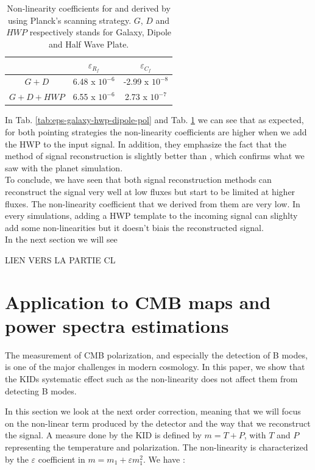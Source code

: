 \begin{table}[h!]
\center
	\begin{tabular}{|c|c|c|}
  	\hline
 	\backslashbox{$Input signal$}{$\varepsilon$} & $	\varepsilon_{R_{f}}$ & $\varepsilon_{C_{f}} $ \\
	\hline
 	$G+D$  & 6.48 x $10^{-6}$ & -2.99 x $10^{-8}$ \\
  	\hline
 	$G+D+HWP$ & 6.55 x $10^{-6}$ & 2.73 x $10^{-7}$ \\
  	\hline
	\end{tabular} 
\caption{Non-linearity coefficients \eps for \rf and \cf derived by using Planck's scanning strategy. $G$, $D$ and $HWP$ respectively stands for Galaxy, Dipole and Half Wave Plate.}
\label{tab:eps-galaxy-hwp-dipole-planck}
\end{table}

In Tab. \ref{tab:eps-galaxy-hwp-dipole-pol} and Tab. \ref{tab:eps-galaxy-hwp-dipole-planck} we can see that as expected, for both pointing strategies the non-linearity coefficients are higher when we add the HWP to the input signal. In addition, they emphasize the fact that the \cf method of signal reconstruction is slightly better than \rf, which confirms what we saw with the planet simulation.\\

To conclude, we have seen that both signal reconstruction methods can reconstruct the signal very well at low fluxes but start to be limited at higher fluxes. The non-linearity coefficient that we derived from them are very low. In every simulations, adding a HWP template to the incoming signal can slighlty add some non-linearities but it doesn't biais the reconstructed signal.\\

In the next section we will see 

LIEN VERS LA PARTIE CL

\section{Application to CMB maps and power spectra estimations}
The measurement of CMB polarization, and especially the detection of B modes, is one of the major challenges in modern cosmology. In this paper, we show that the KIDs systematic effect such as the non-linearity does not affect them from detecting B modes.

In this section we look at the next order correction, meaning that we will focus on the non-linear term produced by the detector and the way that we reconstruct the signal. A measure done by the KID is defined by $m = T + P$, with $T$ and $P$ representing the temperature and polarization. The non-linearity is characterized  by the $\varepsilon$ coefficient in $ m = m_{1} + \varepsilon m_{1}^{2}$. We have : 

